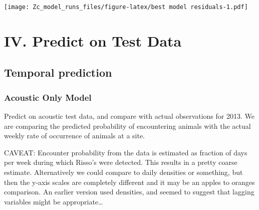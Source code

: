 \documentclass[11pt,]{article}
\newenvironment{Shaded}{\begin{snugshade}}{\end{snugshade}}
\newcommand{\CommentTok}[1]{\textcolor[rgb]{0.56,0.35,0.01}{\textit{{#1}}}}
\begin{document}
\texttt{[image: Zc\_model\_runs\_files/figure-latex/best model residuals-1.pdf]}

\begin{Shaded}
\end{Shaded}

\section{IV. Predict on Test Data}\label{iv.-predict-on-test-data}

\subsection{Temporal prediction}\label{temporal-prediction}

\subsubsection{Acoustic Only Model}\label{acoustic-only-model}

Predict on acoustic test data, and compare with actual observations for
2013. We are comparing the predicted probability of encountering animals
with the actual weekly rate of occurrence of animals at a site.

CAVEAT: Encounter probability from the data is estimated as fraction of
days per week during which Risso's were detected. This results in a
pretty coarse estimate. Alternatively we could compare to daily
densities or something, but then the y-axis scales are completely
different and it may be an apples to oranges comparison. An earlier
version used densities, and seemed to suggest that lagging variables
might be appropriate\ldots{}
\end{document}
